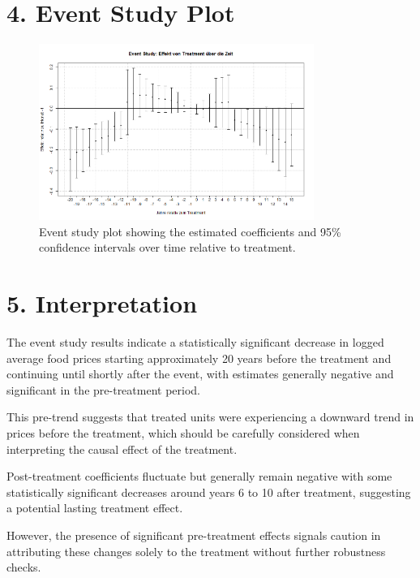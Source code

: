 \documentclass[a4paper,12pt]{article}
\begin{document}
\section*{4. Event Study Plot}

\begin{figure}[ht]
\centering
\includegraphics[width=0.8\textwidth]{Eventstudy.png}
\caption{Event study plot showing the estimated coefficients and 95\% confidence intervals over time relative to treatment.}
\label{fig:event_study_plot}
\end{figure}

\vspace{1em}

\section*{5. Interpretation}

The event study results indicate a statistically significant decrease in logged average food prices starting approximately 20 years before the treatment and continuing until shortly after the event, with estimates generally negative and significant in the pre-treatment period.

This pre-trend suggests that treated units were experiencing a downward trend in prices before the treatment, which should be carefully considered when interpreting the causal effect of the treatment.

Post-treatment coefficients fluctuate but generally remain negative with some statistically significant decreases around years 6 to 10 after treatment, suggesting a potential lasting treatment effect.

However, the presence of significant pre-treatment effects signals caution in attributing these changes solely to the treatment without further robustness checks.

\vspace{1em}
\newpage
\end{document}
